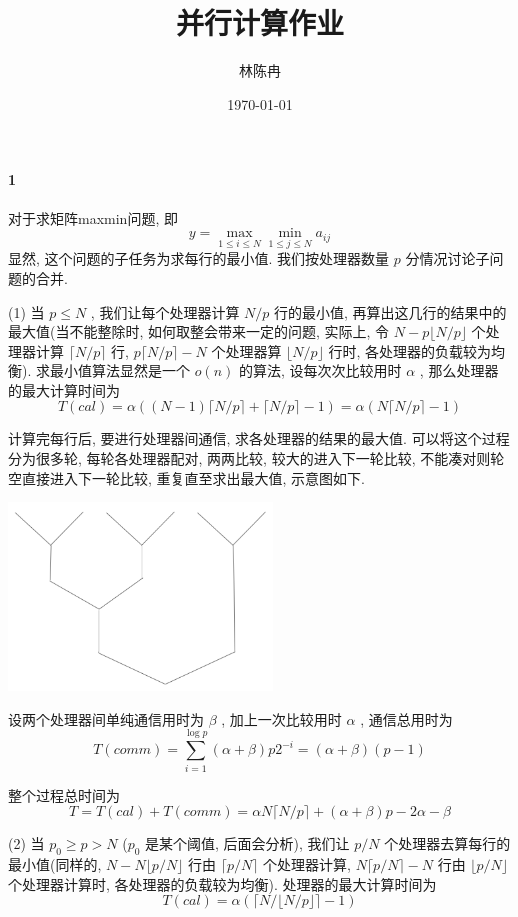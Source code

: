 \documentclass[a4paper, UTF8]{ctexart}				%
\title{并行计算作业}
\author{林陈冉}
\date{\today}
\numberwithin{equation}{section}				%
\begin{document}
    \maketitle										%
    \paragraph{1}\quad 
        对于求矩阵maxmin问题, 即 
        \[
            y = \max_{1 \le i \le N} \min_{1 \le j \le N} a_{ij}
        \]
        显然, 这个问题的子任务为求每行的最小值. 我们按处理器数量 $p$ 分情况讨论子问题的合并.

        (1) 当 $p \le N$ , 我们让每个处理器计算 $N/p$ 行的最小值, 再算出这几行的结果中的最大值(当不能整除时, 如何取整会带来一定的问题, 实际上, 令 $N - p\lfloor N/p \rfloor$ 个处理器计算 $\lceil N/p \rceil$ 行, $p\lceil N/p \rceil - N$ 个处理器算 $\lfloor N/p \rfloor$ 行时, 各处理器的负载较为均衡). 求最小值算法显然是一个 $o(n)$ 的算法, 设每次次比较用时 $\alpha$ , 那么处理器的最大计算时间为
        \[
            T(cal) = \alpha ((N - 1)\lceil N/p \rceil + \lceil N/p \rceil - 1) = \alpha (N \lceil N/p \rceil - 1)
        \]

        计算完每行后, 要进行处理器间通信, 求各处理器的结果的最大值. 可以将这个过程分为很多轮, 每轮各处理器配对, 两两比较, 较大的进入下一轮比较, 不能凑对则轮空直接进入下一轮比较, 重复直至求出最大值, 示意图如下.
        \begin{center}
        \includegraphics[width=7cm,height=5cm]{pic_2.png}
        \end{center}
        设两个处理器间单纯通信用时为 $\beta$ , 加上一次比较用时 $\alpha$ , 通信总用时为
        \[
            T(comm) = \sum_{i=1}^{\log p} (\alpha + \beta) p 2^{-i} = (\alpha + \beta)(p-1)
        \]

        整个过程总时间为
        \[
            T = T(cal) + T(comm) = \alpha N \lceil N/p \rceil + (\alpha + \beta) p - 2\alpha - \beta
        \]
        
        
        (2) 当 $p_0 \ge p > N$ ($p_0$ 是某个阈值, 后面会分析), 我们让 $p/N$ 个处理器去算每行的最小值(同样的, $N - N\lfloor p/N \rfloor$ 行由 $\lceil p/N \rceil$ 个处理器计算, $N\lceil p/N \rceil - N$ 行由 $\lfloor p/N \rfloor$ 个处理器计算时, 各处理器的负载较为均衡). 处理器的最大计算时间为
        \[
            T(cal) = \alpha (\lceil N/ \lfloor N/p \rfloor \rceil - 1)
        \]
\end{document}
